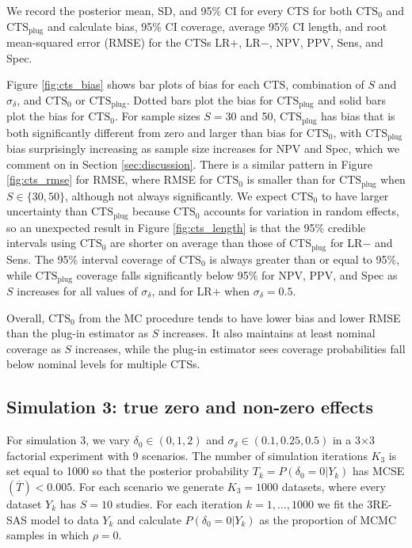 \documentclass[AMA,STIX1COL]{WileyNJD-v2}
\newcommand{\CTSo}{\text{CTS}_0}
\newcommand{\CTSp}{\text{CTS}_{\text{plug}}}
\begin{document}
We record the posterior mean, SD, and 95\% CI for every CTS for both $\CTSo$ and $\CTSp$ and calculate bias, 95\% CI coverage, average 95\% CI length, and root mean-squared error (RMSE) for the CTSs LR$+$, LR$-$, NPV, PPV, Sens, and Spec. 

Figure \ref{fig:cts_bias} shows bar plots of bias for each CTS, combination of $S$ and $\sigma_{\delta}$, and $\CTSo$ or $\CTSp$. Dotted bars plot the bias for $\CTSp$ and solid bars plot the bias for $\CTSo$. For sample sizes $S = 30$ and 50, $\CTSp$ has bias that is both significantly different from zero and larger than bias for $\CTSo$, with $\CTSp$ bias surprisingly increasing as sample size increases for NPV and Spec, which we comment on in Section \ref{sec:discussion}. There is a similar pattern in Figure \ref{fig:cts_rmse} for RMSE, where RMSE for $\CTSo$ is smaller than for $\CTSp$ when $S \in \{30, 50\}$, although not always significantly. We expect $\CTSo$ to have larger uncertainty than $\CTSp$ because $\CTSo$ accounts for variation in random effects, so an unexpected result in Figure \ref{fig:cts_length} is that the 95\% credible intervals using $\CTSo$ are shorter on average than those of $\CTSp$ for LR$-$ and Sens. The 95\% interval coverage of $\CTSo$ is always greater than or equal to 95\%, while $\CTSp$ coverage falls significantly below 95\% for NPV, PPV, and Spec as $S$ increases for all values of $\sigma_{\delta}$, and for LR$+$ when $\sigma_{\delta}=0.5$. 

Overall, $\CTSo$ from the MC procedure tends to have lower bias and lower RMSE than the plug-in estimator as $S$ increases. It also maintains at least nominal coverage as $S$ increases, while the plug-in estimator sees coverage probabilities fall below nominal levels for multiple CTSs.

\subsection{Simulation 3: true zero and non-zero effects} \label{sec:sim_zero}

For simulation 3, we vary $\delta_0 \in (0, 1, 2)$ and $\sigma_\delta \in (0.1, 0.25, 0.5)$ in a 3$\times$3 factorial experiment with 9 scenarios. The number of simulation iterations $K_3$ is set equal to 1000 so that the posterior probability $T_k = P(\delta_0 = 0 \vert Y_k)$ has MCSE$(\overline{T})< 0.005$. For each scenario we generate $K_3 = 1000$ datasets, where every dataset $Y_k$ has $S = 10$ studies. For each iteration $k = 1, \dots, 1000$ we fit the 3RE-SAS model to data $Y_k$ and calculate $P(\delta_0 = 0 \vert Y_k)$ as the proportion of MCMC samples in which $\rho = 0$. 
\end{document}
